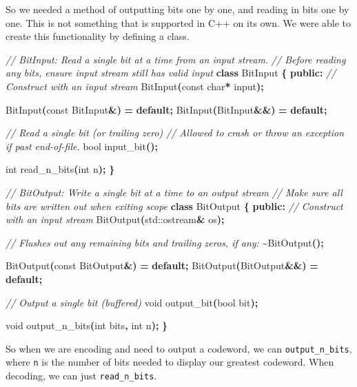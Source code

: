 \documentclass[12pt,twoside]{reedthesis}
\newenvironment{Shaded}{\begin{snugshade}}{\end{snugshade}}
\newcommand{\AttributeTok}[1]{\textcolor[rgb]{0.77,0.63,0.00}{#1}}
\newcommand{\BuiltInTok}[1]{#1}
\newcommand{\CommentTok}[1]{\textcolor[rgb]{0.56,0.35,0.01}{\textit{#1}}}
\newcommand{\ControlFlowTok}[1]{\textcolor[rgb]{0.13,0.29,0.53}{\textbf{#1}}}
\newcommand{\DataTypeTok}[1]{\textcolor[rgb]{0.13,0.29,0.53}{#1}}
\newcommand{\KeywordTok}[1]{\textcolor[rgb]{0.13,0.29,0.53}{\textbf{#1}}}
\newcommand{\NormalTok}[1]{#1}
\newcommand{\OperatorTok}[1]{\textcolor[rgb]{0.81,0.36,0.00}{\textbf{#1}}}
\begin{document}
So we needed a method of outputting bits one by one, and reading in bits one by one. This is not something that is supported in C++ on its own. We were able to create this functionality by defining a class.
\begin{Shaded}
\begin{Highlighting}[]
\CommentTok{// BitInput: Read a single bit at a time from an input stream.}
\CommentTok{// Before reading any bits, ensure input stream still has valid input}
\KeywordTok{class}\NormalTok{ BitInput }\OperatorTok{\{}
 \KeywordTok{public}\OperatorTok{:}
  \CommentTok{// Construct with an input stream}
\NormalTok{  BitInput}\OperatorTok{(}\AttributeTok{const} \DataTypeTok{char}\OperatorTok{*}\NormalTok{ input}\OperatorTok{);}

\NormalTok{  BitInput}\OperatorTok{(}\AttributeTok{const}\NormalTok{ BitInput}\OperatorTok{\&)} \OperatorTok{=} \ControlFlowTok{default}\OperatorTok{;}
\NormalTok{  BitInput}\OperatorTok{(}\NormalTok{BitInput}\OperatorTok{\&\&)} \OperatorTok{=} \ControlFlowTok{default}\OperatorTok{;}

  \CommentTok{// Read a single bit (or trailing zero)}
  \CommentTok{// Allowed to crash or throw an exception if past end{-}of{-}file.}
  \DataTypeTok{bool}\NormalTok{ input\_bit}\OperatorTok{();}

  \DataTypeTok{int}\NormalTok{ read\_n\_bits}\OperatorTok{(}\DataTypeTok{int}\NormalTok{ n}\OperatorTok{);}
\OperatorTok{\}}

\CommentTok{// BitOutput: Write a single bit at a time to an output stream}
\CommentTok{// Make sure all bits are written out when exiting scope}
\KeywordTok{class}\NormalTok{ BitOutput }\OperatorTok{\{}
 \KeywordTok{public}\OperatorTok{:}
  \CommentTok{// Construct with an input stream}
\NormalTok{  BitOutput}\OperatorTok{(}\BuiltInTok{std::}\NormalTok{ostream}\OperatorTok{\&}\NormalTok{ os}\OperatorTok{);}

  \CommentTok{// Flushes out any remaining bits and trailing zeros, if any:}
  \OperatorTok{\textasciitilde{}}\NormalTok{BitOutput}\OperatorTok{();}

\NormalTok{  BitOutput}\OperatorTok{(}\AttributeTok{const}\NormalTok{ BitOutput}\OperatorTok{\&)} \OperatorTok{=} \ControlFlowTok{default}\OperatorTok{;}
\NormalTok{  BitOutput}\OperatorTok{(}\NormalTok{BitOutput}\OperatorTok{\&\&)} \OperatorTok{=} \ControlFlowTok{default}\OperatorTok{;}

  \CommentTok{// Output a single bit (buffered)}
  \DataTypeTok{void}\NormalTok{ output\_bit}\OperatorTok{(}\DataTypeTok{bool}\NormalTok{ bit}\OperatorTok{);}

  \DataTypeTok{void}\NormalTok{ output\_n\_bits}\OperatorTok{(}\DataTypeTok{int}\NormalTok{ bits}\OperatorTok{,} \DataTypeTok{int}\NormalTok{ n}\OperatorTok{);}
\OperatorTok{\}}
\end{Highlighting}
\end{Shaded}
So when we are encoding and need to output a codeword, we can \texttt{output\_n\_bits}, where \texttt{n} is the number of bits needed to display our greatest codeword. When decoding, we can just \texttt{read\_n\_bits}.
\end{document}

